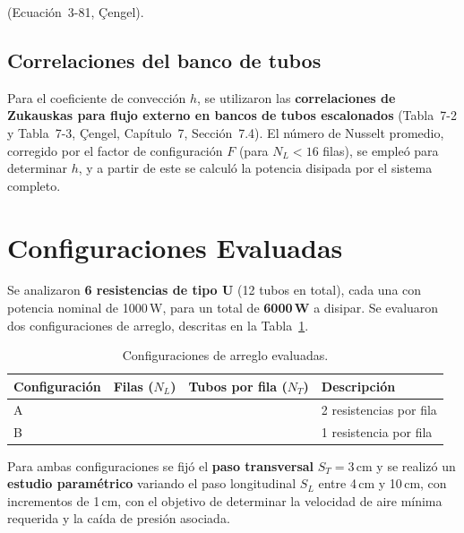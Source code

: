 \documentclass[12pt, a4paper]{article}
\begin{document}
(Ecuación~3-81, Çengel).

\subsection{Correlaciones del banco de tubos}

Para el coeficiente de convección $h$, se utilizaron las \textbf{correlaciones de Zukauskas
para flujo externo en bancos de tubos escalonados} (Tabla~7-2 y Tabla~7-3, Çengel,
Capítulo~7, Sección~7.4). El número de Nusselt promedio, corregido por el factor de
configuración $F$ (para $N_L < 16$ filas), se empleó para determinar $h$, y a partir de este
se calculó la potencia disipada por el sistema completo.

\section{Configuraciones Evaluadas}

Se analizaron \textbf{6 resistencias de tipo U} (12 tubos en total), cada una con potencia
nominal de 1000\,W, para un total de \textbf{6000\,W} a disipar. Se evaluaron dos
configuraciones de arreglo, descritas en la Tabla~\ref{tab:configs}.

\begin{table}[h!]
    \centering
    \caption{Configuraciones de arreglo evaluadas.}
    \label{tab:configs}
    \begin{tabular}{>{\centering\arraybackslash}m{2.2cm}
                    >{\centering\arraybackslash}m{2.2cm}
                    >{\centering\arraybackslash}m{3cm}
                    m{4.8cm}}
        \toprule
        \textbf{Configuración} & \textbf{Filas ($N_L$)} & \textbf{Tubos por fila ($N_T$)} & \textbf{Descripción} \\
        \midrule
        A & 3 & 4 & 2 resistencias por fila \\
        B & 6 & 2 & 1 resistencia por fila  \\
        \bottomrule
    \end{tabular}
\end{table}

Para ambas configuraciones se fijó el \textbf{paso transversal} $S_T = 3\,\text{cm}$ y se
realizó un \textbf{estudio paramétrico} variando el paso longitudinal $S_L$ entre 4\,cm y
10\,cm, con incrementos de 1\,cm, con el objetivo de determinar la velocidad de aire mínima
requerida y la caída de presión asociada.
\end{document}

